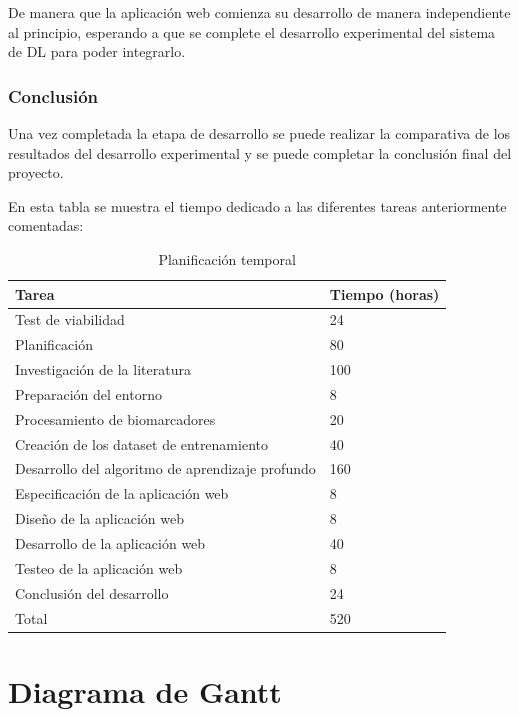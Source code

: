 De manera que la aplicación web comienza su desarrollo de manera independiente al principio, esperando a que se complete
el desarrollo experimental del sistema de DL para poder integrarlo.

\subsubsection{Conclusión}
Una vez completada la etapa de desarrollo se puede realizar la comparativa de los resultados del desarrollo experimental
y se puede completar la conclusión final del proyecto.

En esta tabla se muestra el tiempo dedicado a las diferentes tareas anteriormente comentadas:

\begin{table}[H]
    \centering
    \begin{tabular}{|l|l|}
        \hline
        \textbf{Tarea} & \textbf{Tiempo (horas)} \\
        \hline
        Test de viabilidad & 24 \\
        \hline
        Planificación & 80 \\
        \hline
        Investigación de la literatura & 100 \\
        \hline
        Preparación del entorno & 8 \\
        \hline
        Procesamiento de biomarcadores & 20 \\
        \hline
        Creación de los dataset de entrenamiento & 40 \\
        \hline
        Desarrollo del algoritmo de aprendizaje profundo & 160 \\
        \hline
        Especificación de la aplicación web & 8 \\
        \hline
        Diseño de la aplicación web & 8 \\
        \hline
        Desarrollo de la aplicación web & 40 \\
        \hline
        Testeo de la aplicación web & 8 \\
        \hline
        Conclusión del desarrollo & 24 \\
        \hline
        \hline
        Total & 520 \\
        \hline
    \end{tabular}
    \caption{Planificación temporal}
    \label{tab:tabla_planificacion_temporal}
\end{table}

\section{Diagrama de Gantt}\label{sec:diagrama-de-gantt}

